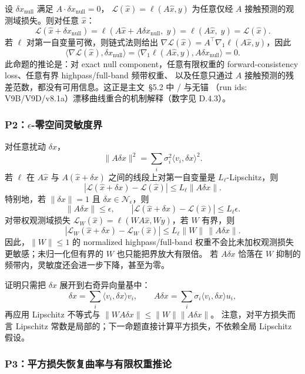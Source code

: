 设 \(\delta x_{\mathrm{null}}\) 满足 \(A \cdot \delta x_{\mathrm{null}} = 0\)，
\(\mathcal{L}(\hat{x}) = \ell(A\hat{x}, y)\) 为任意仅经 \(A\) 接触预测的观测域损失。则对任意 \(\hat{x}\)：
\[
  \mathcal{L}(\hat{x} + \delta x_{\mathrm{null}}) = \ell(A\hat{x} + A\delta x_{\mathrm{null}},\; y) = \ell(A\hat{x},\; y) = \mathcal{L}(\hat{x}).
\]
若 \(\ell\) 对第一自变量可微，则链式法则给出 \(\nabla\mathcal L(\hat{x})=A^\top\nabla_1\ell(A\hat{x},y)\)，因此
\[
  \langle \nabla\mathcal L(\hat{x}),\delta x_{\mathrm{null}}\rangle
  =\langle \nabla_1\ell(A\hat{x},y),A\delta x_{\mathrm{null}}\rangle=0.
\]
此命题的推论是：对 exact null component，任意有限权重的 forward-consistency loss、任意有界 highpass/full-band 频带权重、
以及任意只通过 \(A\) 接触预测的残差范数，都没有可用信息。这正是主文~\S5.2 中  /  与无锚 （run ids: V9B/V9D/v8.1a）漂移曲线重合的机制解释（数字见 D.4.3）。

\subsubsection{P2：\texorpdfstring{\(\epsilon\)}{epsilon}-零空间灵敏度界}

对任意扰动 \(\delta x\)，
\[
  \|A\delta x\|^2=\sum_i \sigma_i^2\langle v_i,\delta x\rangle^2.
\]
若 \(\ell\) 在 \(A\hat{x}\) 与 \(A(\hat{x}+\delta x)\) 之间的线段上对第一自变量是 \(L_\ell\)-Lipschitz，则
\[
  |\mathcal L(\hat{x}+\delta x)-\mathcal L(\hat{x})|
  \le L_\ell\|A\delta x\|.
\]
特别地，若 \(\|\delta x\|=1\) 且 \(\delta x\in\mathcal N_\epsilon\)，则
\[
  \|A\delta x\|\le\epsilon,\qquad
  |\mathcal L(\hat{x}+\delta x)-\mathcal L(\hat{x})|\le L_\ell\epsilon.
\]
对带权观测域损失 \(\mathcal L_W(\hat{x})=\ell(WA\hat{x},Wy)\)，若 \(W\) 有界，则
\[
  |\mathcal L_W(\hat{x}+\delta x)-\mathcal L_W(\hat{x})|
  \le L_\ell\|W\|\,\|A\delta x\|.
\]
因此，\(\|W\|\le1\) 的 normalized highpass/full-band 权重不会比未加权观测损失更敏感；未归一化但有界的 \(W\) 也只能把界放大有限倍。
若 \(A\delta x\) 恰落在 \(W\) 抑制的频带内，灵敏度还会进一步下降，甚至为零。

证明只需把 \(\delta x\) 展开到右奇异向量基中：
\[
  \delta x=\sum_i\langle v_i,\delta x\rangle v_i,\qquad
  A\delta x=\sum_i\sigma_i\langle v_i,\delta x\rangle u_i,
\]
再应用 Lipschitz 不等式与 \(\|WA\delta x\|\le\|W\|\|A\delta x\|\)。
注意，对平方损失而言 Lipschitz 常数是局部的；下一命题直接计算平方损失，不依赖全局 Lipschitz 假设。

\subsubsection{P3：平方损失恢复曲率与有限权重推论}

